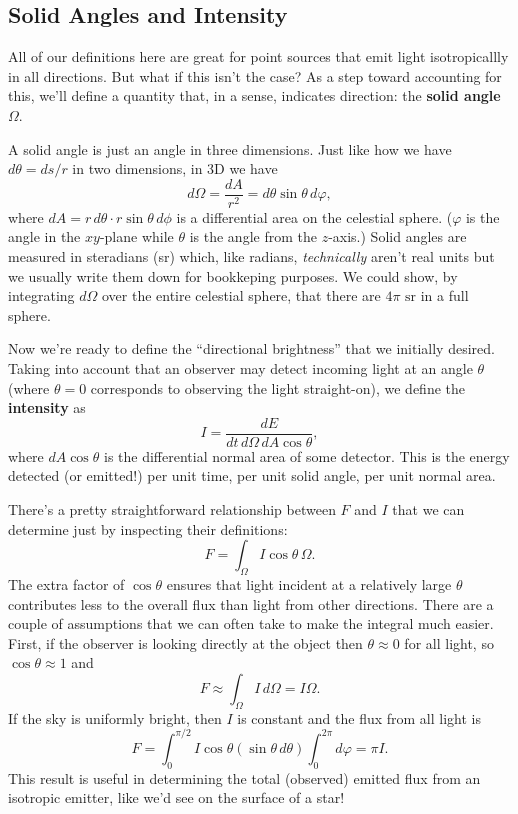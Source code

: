 \documentclass[../a062main.tex]{subfiles}
\begin{document}
\subsection*{Solid Angles and Intensity}
All of our definitions here are great for point sources that emit light isotropicallly in all directions.
But what if this isn't the case?
As a step toward accounting for this, we'll define a quantity that, in a sense, indicates direction: the \textbf{solid angle} $\Omega$.

A solid angle is just an angle in three dimensions.
Just like how we have $d\theta = ds/r$ in two dimensions, in 3D we have
\[ \boxed{d \Omega = \frac{dA}{r^2} = d\theta \sin \theta \,d\varphi}, \]
where $dA = r\,d\theta \cdot r \sin \theta \,d\phi$ is a differential area on the celestial sphere.
($\varphi$ is the angle in the $xy$-plane while $\theta$ is the angle from the $z$-axis.)
Solid angles are measured in steradians (sr) which, like radians, \textit{technically} aren't real units but we usually write them down for bookkeping purposes.
We could show, by integrating $d\Omega$ over the entire celestial sphere, that there are $4\pi \text{ sr}$ in a full sphere.

Now we're ready to define the ``directional brightness'' that we initially desired.
Taking into account that an observer may detect incoming light at an angle $\theta$ (where $\theta = 0$ corresponds to observing the light straight-on), we define the \textbf{intensity} as
\[ \boxed{I = \frac{dE}{dt \, d\Omega \, dA \cos \theta}}, \]
where $dA \cos \theta$ is the differential normal area of some detector.
This is the energy detected (or emitted!) per unit time, per unit solid angle, per unit normal area.

There's a pretty straightforward relationship between $F$ and $I$ that we can determine just by inspecting their definitions:
\[ F = \int_{\Omega}^{} I \cos \theta \,\Omega. \]
The extra factor of $\cos \theta$ ensures that light incident at a relatively large $\theta$ contributes less to the overall flux than light from other directions.
There are a couple of assumptions that we can often take to make the integral much easier.
First, if the observer is looking directly at the object then $\theta \approx 0$ for all light, so $\cos \theta \approx 1$ and
\[ F \approx \int_{\Omega}^{} I \,d\Omega = I \Omega. \]
If the sky is uniformly bright, then $I$ is constant and the flux from all light is
\[ F = \int_{0}^{\pi / 2} I \cos\theta (\sin\theta \,d\theta) \int_{0}^{2\pi}d\varphi = \pi I. \]
This result is useful in determining the total (observed) emitted flux from an isotropic emitter, like we'd see on the surface of a star!
\end{document}

